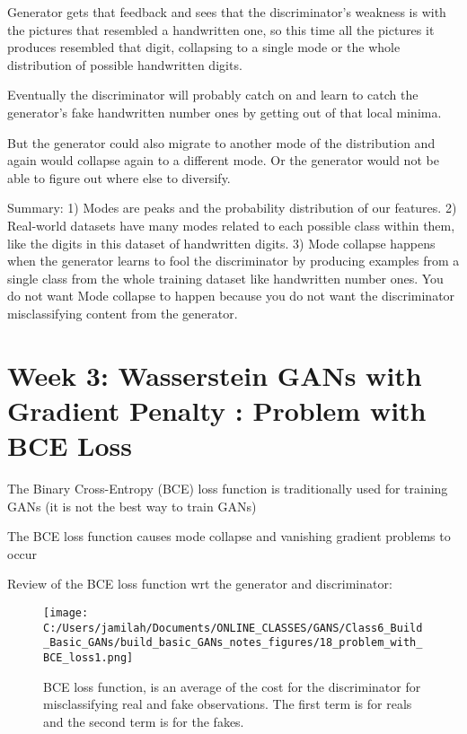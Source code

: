 \documentclass[11pt, onecolumn]{article}
\begin{document}
\begin{itemize}
Generator gets that feedback and sees that the discriminator's weakness is with the pictures that resembled a handwritten one, so this time all the pictures it produces resembled that digit, collapsing to a single mode or the whole distribution of possible handwritten digits.

Eventually the discriminator will probably catch on and learn to catch the generator's fake handwritten number ones by getting out of that local minima.

But the generator could also migrate to another mode of the distribution and again would collapse again to a different mode.
Or the generator would not be able to figure out where else to diversify.

Summary:
1) Modes are peaks and the probability distribution of our features.
2) Real-world datasets have many modes related to each possible class within them, like the digits in this dataset of handwritten digits.
3) Mode collapse happens when the generator learns to fool the discriminator by producing examples from a single class from
the whole training dataset like handwritten number ones. You do not want Mode collapse to happen because you do not want the discriminator misclassifying content from the generator.


\section{Week 3: Wasserstein GANs with Gradient Penalty : Problem with BCE Loss}

The Binary Cross-Entropy (BCE) loss function is traditionally used for training GANs (it is not the best way to train GANs)

The BCE loss function causes mode collapse and vanishing gradient problems to occur

Review of the BCE loss function wrt the generator and discriminator:
\begin{figure}[htp]
\begin{center}
\texttt{[image: C:/Users/jamilah/Documents/ONLINE\_CLASSES/GANS/Class6\_Build\_Basic\_GANs/build\_basic\_GANs\_notes\_figures/18\_problem\_with\_BCE\_loss1.png]}
\end{center}
\caption{BCE loss function, is an average of the cost for the discriminator for misclassifying real and fake observations. The first term is for reals and the second term is for the fakes.}
\label{18_problem_with_BCE_loss1}
\end{figure}


\end{itemize}
\end{document}
